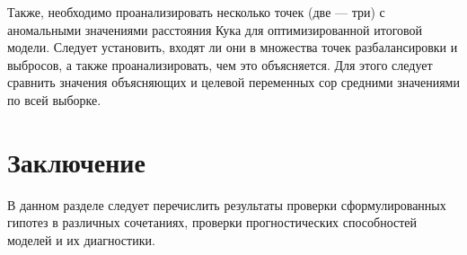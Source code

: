 \documentclass[12pt]{article}
\begin{document}
Также, необходимо проанализировать несколько точек (две — три) с аномальными
значениями расстояния Кука для оптимизированной итоговой модели. Следует установить,
входят ли они в множества точек разбалансировки и выбросов, а также проанализировать,
чем это объясняется. Для этого следует сравнить значения объясняющих и целевой
переменных сор средними значениями по всей выборке.

\section{Заключение}
В данном разделе следует перечислить результаты проверки сформулированных
гипотез в различных сочетаниях, проверки прогностических способностей моделей и их
диагностики.
\end{document}
